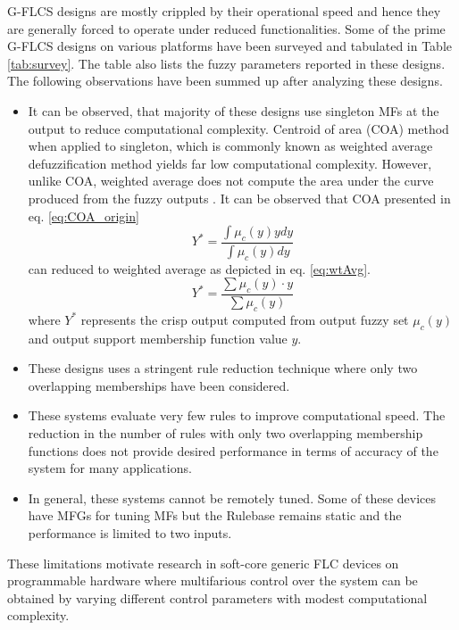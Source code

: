 G\hyp{}FLCS designs are mostly crippled by their operational speed and hence they are generally forced to operate under reduced functionalities. Some of the prime G\hyp{}FLCS designs on various platforms have been surveyed and tabulated in Table \ref{tab:survey}. The table also lists the fuzzy parameters reported in these designs. The following observations have been summed up after analyzing these designs. 
\begin{itemize}
	\item It can be observed, that majority of these designs use singleton MFs at the output to reduce computational complexity. Centroid of area (COA) method when applied to singleton, which is commonly known as weighted average defuzzification method yields far low computational complexity. However, unlike COA, weighted average does not compute the area under the curve produced from the fuzzy outputs \cite{Ross2010}. It can be observed that COA presented in eq. \eqref{eq:COA_origin} 
		\begin{equation} \label{eq:COA_origin}
		Y^* = \frac{{\int {{\mu _c}(y)ydy} }}{{\int {{\mu _c}(y)dy} }}
		\end{equation}
	can reduced to weighted average	as depicted in eq. \eqref{eq:wtAvg}.
	\begin{equation}\label{eq:wtAvg}
	{Y^*} = \frac{{\sum {{\mu _c}(y) \cdot y} }}{{\sum {{\mu _c}(y)} }}
	\end{equation}
	where $ Y^* $ represents the crisp output computed from output fuzzy set $ {\mu _c}(y) $ and output support membership function value $ y $.
	\item These designs uses a stringent rule reduction technique where only two overlapping memberships have been considered.
	\item These systems evaluate very few rules to improve computational speed. The reduction in the number of rules with only two overlapping membership functions does not provide desired performance in terms of accuracy of the system for many applications.
	\item In general, these systems cannot be remotely tuned. Some of these devices have MFGs for tuning MFs but the Rulebase remains static and the performance is limited to two inputs. 
\end{itemize} 	
These limitations motivate research in soft\hyp{}core generic FLC devices on programmable hardware where multifarious control over the system can be obtained by varying different control parameters with modest computational complexity.

